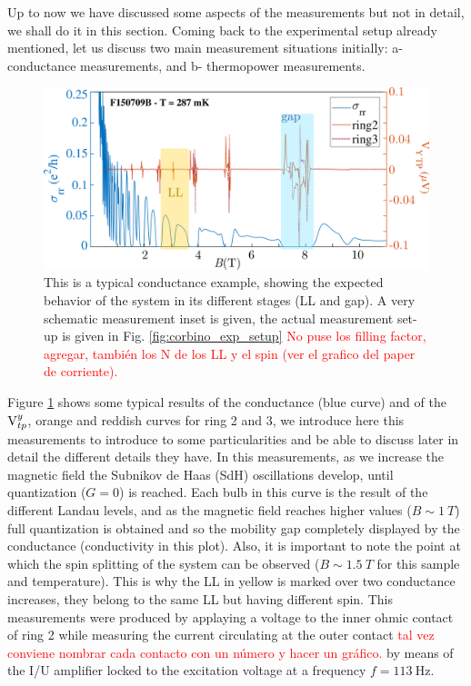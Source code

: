 Up to now we have discussed some aspects of the measurements but not in detail, we shall do it in this section. Coming back to the experimental setup already mentioned, let us discuss two main measurement situations initially: a- conductance measurements, and b- thermopower measurements. 

\begin{figure}
    \centering
    \includegraphics[width=1\textwidth]{figures/experimental/GandVtpExample.png}
    \caption{This is a typical conductance example, showing the expected behavior of the system in its different stages (LL and gap). A very schematic measurement inset is given, the actual measurement set-up is given in Fig. \ref{fig:corbino_exp_setup} \textcolor{red}{No puse los filling factor, agregar, también los N de los LL y el spin (ver el grafico del paper de corriente).}}
    \label{fig:GandVtpExample}
\end{figure}

Figure \ref{fig:GandVtpExample} shows some typical results of the conductance (blue curve) and of the \( \text{V}_{tp}^y \), orange and reddish curves for ring 2 and 3, we introduce here this measurements to introduce to some particularities and be able to discuss later in detail the different details they have. 
In this measurements, as we increase the magnetic field the Subnikov de Haas (SdH) oscillations develop, until quantization ($G = 0$) is reached. Each bulb in this curve is the result of the different Landau levels, and as the magnetic field reaches higher values ($B \sim \SI{1}{T}$) full quantization is obtained and so the mobility gap completely displayed by the conductance (conductivity in this plot). Also, it is important to note the point at which the spin splitting of the system can be observed ($B \sim \SI{1.5}{T}$ for this sample and temperature). This is why the LL in yellow is marked over two conductance increases, they belong to the same LL but having different spin. This measurements were produced by applaying a voltage to the inner ohmic contact of ring 2 while measuring the current circulating at the outer contact 
\textcolor{red}{tal vez conviene nombrar cada contacto con un número y hacer un gráfico.}
by means of the I/U amplifier locked to the excitation voltage at a frequency $f = \SI{113}{\hertz}$. 

